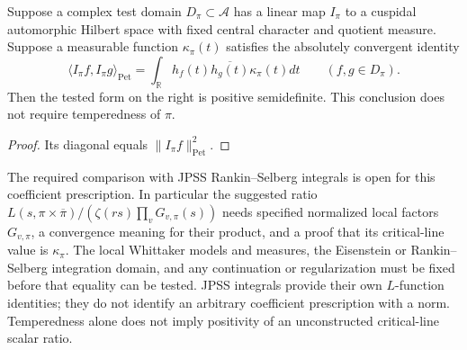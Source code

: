 \begin{proposition}
\label{v4-arith:w6-b:thm:higher-rank-RS}
Suppose a complex test domain $D_\pi\subset\mathscr A$ has a linear
map $I_\pi$ to a cuspidal automorphic Hilbert space with fixed
central character and quotient measure. Suppose a measurable
function $\kappa_\pi(t)$ satisfies the absolutely convergent identity
\begin{equation}
\label{v4-arith:w6-b:eq:higher-rank-RS}
 \langle I_\pi f,I_\pi g\rangle_{\mathrm{Pet}}
 =\int_{\mathbb R}h_f(t)\overline{h_g(t)}\kappa_\pi(t)dt
 \qquad(f,g\in D_\pi).
\end{equation}
Then the tested form on the right is positive semidefinite.
This conclusion does not require temperedness of $\pi$.
\end{proposition}
\begin{proof}
Its diagonal equals $\|I_\pi f\|_{\mathrm{Pet}}^2$.
\end{proof}
The required comparison with JPSS Rankin--Selberg integrals is open
for this coefficient prescription. In particular the suggested ratio
$L(s,\pi\times\overline\pi)/(\zeta(rs)\prod_vG_{v,\pi}(s))$
needs specified normalized local factors $G_{v,\pi}$, a convergence
meaning for their product, and a proof that its critical-line value
is $\kappa_\pi$. The local Whittaker models and measures, the
Eisenstein or Rankin--Selberg integration domain, and any continuation
or regularization must be fixed before that equality can be tested.
JPSS integrals provide their own $L$-function identities; they do
not identify an arbitrary coefficient prescription with a norm.
Temperedness alone does not imply positivity of an unconstructed
critical-line scalar ratio.

